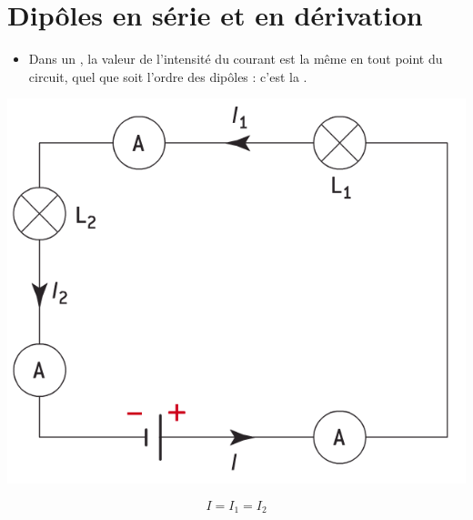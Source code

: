 \documentclass[xcolor={dvipsnames}]{beamer}
\begin{document}
\section{Dipôles en série et en dérivation}


\begin{frame}

	\begin{alertblock}{}
		
		\begin{itemize}
			\item Dans un , la valeur de l'intensité du courant est la même en tout point du circuit, quel que soit l'ordre des dipôles : c'est la .
		\end{itemize}
		
			\begin{center}
				\includegraphics[scale=0.35]{../img/schema2}
			
				\vspace*{-0.5cm}
					\begin{equation*}
					I = I_1 = I_2
					\end{equation*}
		\end{center}
	\end{alertblock}
\end{frame}
\end{document}
